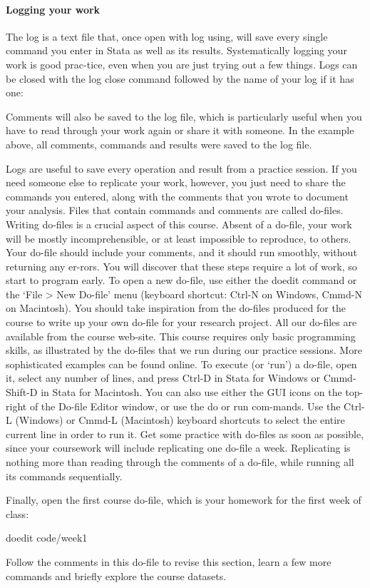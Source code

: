 \paragraph{Logging your work}

The log is a text file that, once open with log using, will save every single command you enter in Stata as well as its results. Systematically logging your work is good prac-tice, even when you are just trying out a few things. Logs can be closed with the log close command followed by the name of your log if it has one:

Comments will also be saved to the log file, which is particularly useful when you have to read through your work again or share it with someone. In the example above, all comments, commands and results were saved to the log file.


Logs are useful to save every operation and result from a practice session. If you need someone else to replicate your work, however, you just need to share the commands you entered, along with the comments that you wrote to document your analysis. Files that contain commands and comments are called do-files.
Writing do-files is a crucial aspect of this course. Absent of a do-file, your work will be mostly incomprehensible, or at least impossible to reproduce, to others. Your do-file should include your comments, and it should run smoothly, without returning any er-rors. You will discover that these steps require a lot of work, so start to program early. To open a new do-file, use either the doedit command or the ‘File > New Do-file’ menu (keyboard shortcut: Ctrl-N on Windows, Cmmd-N on Macintosh).
You should take inspiration from the do-files produced for the course to write up your own do-file for your research project. All our do-files are available from the course web-site. This course requires only basic programming skills, as illustrated by the do-files that we run during our practice sessions. More sophisticated examples can be found online.
To execute (or ‘run’) a do-file, open it, select any number of lines, and press Ctrl-D in Stata for Windows or Cmmd-Shift-D in Stata for Macintosh. You can also use either the GUI icons on the top-right of the Do-file Editor window, or use the do or run com-mands. Use the Ctrl-L (Windows) or Cmmd-L (Macintosh) keyboard shortcuts to select the entire current line in order to run it.
Get some practice with do-files as soon as possible, since your coursework will include replicating one do-file a week. Replicating is nothing more than reading through the comments of a do-file, while running all its commands sequentially.


Finally, open the first course do-file, which is your homework for the first week of class:

\begin{docspec}
doedit code/week1
\end{docspec}

Follow the comments in this do-file to revise this section, learn a few more commands and briefly explore the course datasets.
